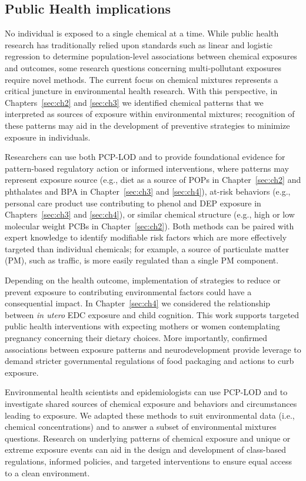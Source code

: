 \subsection{Public Health implications}\label{sec:fin}
No individual is exposed to a single chemical at a time. While public health research has traditionally relied upon standards such as linear and logistic regression to determine population-level associations between chemical exposures and outcomes, some research questions concerning multi-pollutant exposures require novel methods. The current focus on chemical mixtures represents a critical juncture in environmental health research. With this perspective, in Chapters~\ref{sec:ch2} and \ref{sec:ch3} we identified chemical patterns that we interpreted as sources of exposure within environmental mixtures; recognition of these patterns may aid in the development of preventive strategies to minimize exposure in individuals.

Researchers can use both PCP-LOD and \bnmf to provide foundational evidence for pattern-based regulatory action or informed interventions, where patterns may represent exposure source (e.g., diet as a source of POPs in Chapter~\ref{sec:ch2} and phthalates and BPA in Chapter~\ref{sec:ch3} and  \ref{sec:ch4}), at-risk behaviors (e.g., personal care product use contributing to phenol and DEP exposure in Chapters~\ref{sec:ch3} and \ref{sec:ch4}), or similar chemical structure (e.g., high or low molecular weight PCBs in Chapter~\ref{sec:ch2}). Both methods can be paired with expert knowledge to identify modifiable risk factors which are more effectively targeted than individual chemicals; for example, a source of particulate matter (PM), such as traffic, is more easily regulated than a single PM component.

Depending on the health outcome, implementation of strategies to reduce or prevent exposure to contributing environmental factors could have a consequential impact. In Chapter~\ref{sec:ch4} we considered the relationship between \textit{in utero} EDC exposure and child cognition. This work supports targeted public health interventions with expecting mothers or women contemplating pregnancy concerning their dietary choices. More importantly, confirmed associations between exposure patterns and neurodevelopment provide leverage to demand stricter governmental regulations of food packaging and actions to curb exposure.

Environmental health scientists and epidemiologists can use PCP-LOD and \bnmf to investigate shared sources of chemical exposure and behaviors and circumstances leading to exposure. We adapted these methods to suit environmental data (i.e., chemical concentrations) and to answer a subset of environmental mixtures questions. Research on underlying patterns of chemical exposure and unique or extreme exposure events can aid in the design and development of class-based regulations, informed policies, and targeted interventions to ensure equal access to a clean environment.

